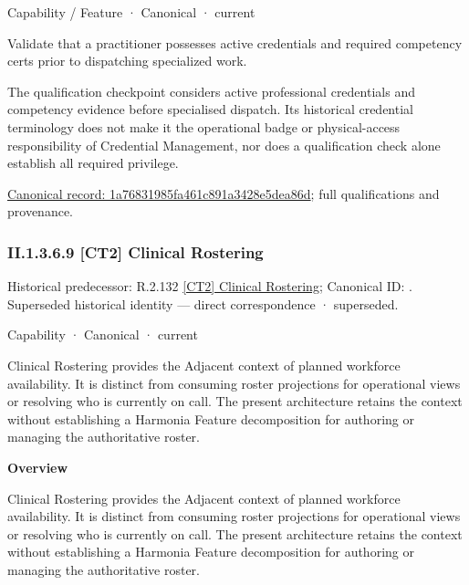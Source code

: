 \label{element:1a76831985fa461c891a3428e5dea86d}
{\small Capability / Feature · Canonical · current}\par

Validate that a practitioner possesses active credentials and required competency certs prior to dispatching specialized work.



The qualification checkpoint considers active professional credentials and competency evidence before specialised dispatch. Its historical credential terminology does not make it the operational badge or physical-access responsibility of Credential Management, nor does a qualification check alone establish all required privilege.


{\footnotesize \href{../../../../../../../continuum/strategy/capability/feature/1a76831985fa461c891a3428e5dea86d.md}{Canonical record: 1a76831985fa461c891a3428e5dea86d}; full qualifications and provenance.}\par
\subsubsection*{II.1.3.6.9 [CT2] Clinical Rostering}
\label{navigation:II.1.3.6.9}

{\small Historical predecessor: R.2.132 \hyperref[element:b6527516a69c499d8cc9c8fe881169fe]{[CT2] Clinical Rostering}; Canonical ID: \texttt{}. Superseded historical identity — direct correspondence · superseded.}\par
\label{element:192ca88a289544dcbf6adaf643f39969}
{\small Capability · Canonical · current}\par

Clinical Rostering provides the Adjacent context of planned workforce availability. It is distinct from consuming roster projections for operational views or resolving who is currently on call. The present architecture retains the context without establishing a Harmonia Feature decomposition for authoring or managing the authoritative roster.



\textbf{Overview}



Clinical Rostering provides the Adjacent context of planned workforce availability. It is distinct from consuming roster projections for operational views or resolving who is currently on call. The present architecture retains the context without establishing a Harmonia Feature decomposition for authoring or managing the authoritative roster.



